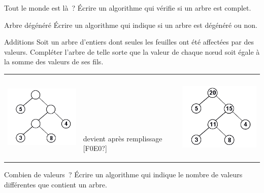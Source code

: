 		\begin{Exercice}{Tout le monde est là~?}
			Écrire un algorithme qui vérifie si un arbre est complet.
		\end{Exercice}

		\begin{Exercice}{Arbre dégénéré}
			Écrire un algorithme qui indique si un arbre est dégénéré ou non.
		\end{Exercice}
		
		\begin{Exercice}{Additions}
			Soit un arbre d'entiers dont seules les feuilles ont été 
			affectées par des valeurs. Compléter l'arbre de telle sorte que
			la valeur de chaque n{\oe}ud soit égale à la somme des valeurs de ses fils.

			\begin{flushleft}
			\tablefirsthead{}
			\tablehead{}
			\tabletail{}
			\tablelasttail{}
			\begin{supertabular}{m{5.215cm}m{5.217cm}m{5.217cm}}
			 \includegraphics[width=4.406cm,height=3.667cm]{image/a2012Logique2eme-img036.png}  &
			~

			~

			~

			{ devient après remplissage [F0E0?]} &
			 \includegraphics[width=4.773cm,height=3.955cm]{image/a2012Logique2eme-img037.png} \\
			\end{supertabular}
			\end{flushleft}

		\end{Exercice}
		
		\begin{Exercice}{Combien de valeurs~?}
			Écrire un algorithme qui indique le nombre de valeurs différentes 
			que contient un arbre.
		\end{Exercice}
		
